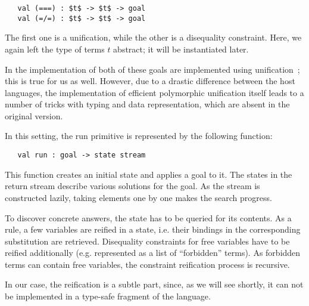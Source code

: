 \begin{lstlisting}
   val (===) : $t$ -> $t$ -> goal
   val (=/=) : $t$ -> $t$ -> goal
\end{lstlisting}

The first one is a unification, while the other is a disequality constraint. Here, we again left
the type of terms $t$ abstract; it will be instantiated later.

In the implementation of \miniKanren both of these goals are implemented using unification~\cite{CKanren}; this
is true for us as well. However, due to a drastic difference between the host languages, the implementation of
efficient polymorphic unification itself leads to a number of tricks with typing and data representation, which are
absent in the original version.

In this setting, the run primitive is represented by the following function:

\begin{lstlisting}
   val run : goal -> state stream
\end{lstlisting}

This function creates an initial state and applies a goal to it. The states in the return stream describe
various solutions for the goal. As the stream is constructed lazily, taking elements one by one makes
the search progress.

To discover concrete answers, the state has to be queried for its contents. As a rule, a few variables
are reified in a state, i.e. their bindings in the corresponding substitution are retrieved.
Disequality constraints for free variables have to be reified additionally (e.g. represented as a list of
``forbidden'' terms). As forbidden terms can contain free variables, the constraint reification
process is recursive.

In our case, the reification is a subtle part, since, as we will see shortly, it can not be implemented in a
type-safe fragment of the language.
